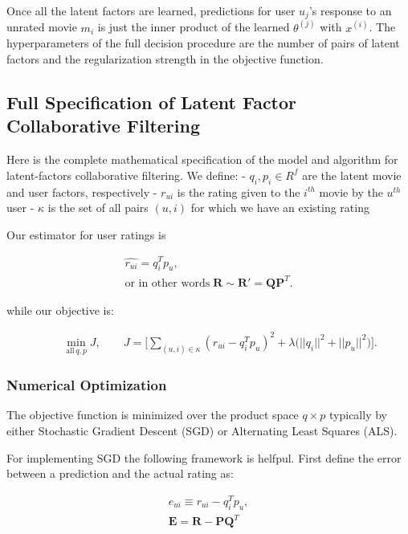 \documentclass[11pt]{article}
\begin{document}
Once all the latent factors are learned, predictions for user \(u_j\)'s
response to an unrated movie \(m_i\) is just the inner product of the
learned \(\theta^{(j)}\) with \(x^{(i)}\). The hyperparameters of the
full decision procedure are the number of pairs of latent factors and
the regularization strength in the objective function.

    \subsection{Full Specification of Latent Factor Collaborative
Filtering}\label{full-specification-of-latent-factor-collaborative-filtering}

Here is the complete mathematical specification of the model and
algorithm for latent-factors collaborative filtering. We define: -
\(q_i, p_i \in R^f\) are the latent movie and user factors, respectively
- \(r_{ui}\) is the rating given to the \(i^{th}\) movie by the
\(u^{th}\) user - \(\kappa\) is the set of all pairs \((u, i)\) for
which we have an existing rating

Our estimator for user ratings is

\begin{align*}
\hat{r_{ui}} = q_i^Tp_u,\\
\textrm{or in other words} \; \mathbf{R} \sim \mathbf{R}' = \mathbf{Q}\mathbf{P}^T.
\end{align*}

while our objective is:

\begin{align*}
\qquad \min_{\textrm{all} \, q, p} J, \qquad J = \bigg[ \sum_{(u,i)\in\kappa} (r_{ui} - q_i^Tp_u)^2 + \lambda\big(||q_i||^2 + ||p_u||^2\big)\bigg].
\end{align*}

\subsubsection{Numerical Optimization}\label{numerical-optimization}

The objective function is minimized over the product space \(q\times p\)
typically by either Stochastic Gradient Descent (SGD) or Alternating
Least Squares (ALS).

    For implementing SGD the following framework is helfpul. First define
the error between a prediction and the actual rating as:

\begin{align*}
e_{ui} \equiv r_{ui} - q_i^Tp_u,\\
\mathbf{E} = \mathbf{R} - \mathbf{P}\mathbf{Q}^T
\end{align*}
\end{document}
